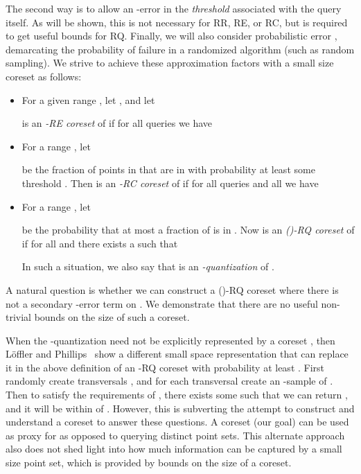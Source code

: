 \documentclass[11pt]{myclass}
\newcommand{\RR}{\textsf{RR}\xspace}
\newcommand{\RC}{\textsf{RC}\xspace}
\newcommand{\RE}{\textsf{RE}\xspace}
\newcommand{\RQ}{\textsf{RQ}\xspace}
\newcommand{\denselist}{\vspace{-.1in} \itemsep -2pt\parsep=-1pt\partopsep -2pt}
\begin{document}
The second way is to allow an -error in the \emph{threshold} associated with the query itself.  As will be shown, this is not necessary for \RR, \RE, or \RC, but is required to get useful bounds for \RQ.  
Finally, we will also consider probabilistic error , demarcating the probability of failure in a randomized algorithm (such as random sampling).  
We strive to achieve these approximation factors with a small size coreset  as follows: 
\begin{itemize}\denselist
\item [\RE:]
For a given range , let , and let 

 is an \emph{-\RE coreset} of  if for all queries   we have

\item [\RC:]
For a range , let 

be the fraction of points in  that are in  with probability at least some threshold .  
Then  is an \emph{-\RC coreset} of  if for all queries  and all  we have

\item [\RQ:]
For a range , let 

be the probability that at most a  fraction of  is in .  
Now  is an \emph{()-\RQ coreset} of  if for all   and  there exists a  such that 

In such a situation, we also say that  is an \emph{-quantization} of .  
\end{itemize}

\vspace{-0mm}
A natural question is whether we can construct a ()-\RQ coreset where there is not a secondary -error term on .  We demonstrate that there are no useful non-trivial bounds on the size of such a coreset.    

When the -quantization  need not be explicitly represented by a coreset , then L\"offler and Phillips~\cite{LP09,JLP11} show a different small space representation that can replace it in the above definition of an -\RQ coreset with probability at least .  First randomly create  transversals , and for each transversal  create an -sample  of .  Then to satisfy the requirements of , there exists some  such that we can return , and it will be within  of .  
However, this is subverting the attempt to construct and understand a coreset to answer these questions.  A coreset  (our goal) can be used as proxy for  as opposed to querying  distinct point sets.  This alternate approach also does not shed light into how much information can be captured by a small size point set, which is provided by bounds on the size of a coreset.  
\end{document}
